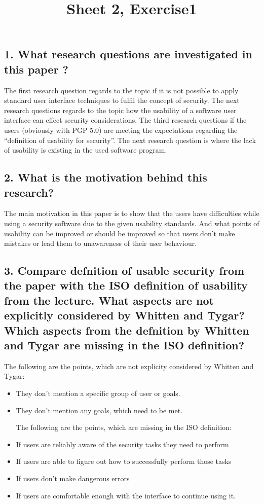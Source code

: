 \title{Sheet 2, Exercise1}

\subsection{1. What research questions are investigated in this paper ? }

The first research question regards to the topic if it is not possible to apply standard user interface techniques to fulfil the concept of security. 
The next research questions regards to the topic how the usability of a software user interface can effect security considerations. 
The third research questions if the users (obviously with PGP 5.0) are meeting the expectations regarding the “definition of usability for security”. 
The next research question is where the lack of usability is existing in the used software program. 


\subsection{2. What is the motivation behind this research? }

The main motivation in this paper is to show that the users have difficulties while using a security software due to the given usability standards. And what points of usability can be improved or should be improved so that users don’t make mistakes or lead them to unawareness of their user behaviour. 

\subsection{3. Compare defnition of usable security from the paper with the ISO definition of
usability from the lecture. What aspects are not explicitly considered by Whitten
and Tygar? Which aspects from the defnition by Whitten and Tygar are missing in
the ISO definition?}


The following are the points, which are not explicity considered by Whitten and Tygar: 
\begin{itemize}
	\item They don’t mention a specific group of user or goals.
	\item They don’t mention any goals, which need to be met. 

The following are the points, which are missing in the ISO definition:
	\item If users are reliably aware of the security tasks they need to perform
	\item If users are able to figure out how to successfully perform those tasks 
	\item If users don’t make dangerous errors 
	\item If users are comfortable enough with the interface to continue using it. 

\end{itemize}

